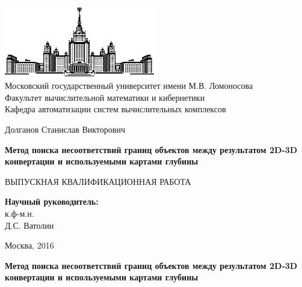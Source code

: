 \documentclass[12pt, a4paper]{article}
\begin{document}
\thispagestyle{empty}

\begin{center}
\ \vspace{-4cm}

\includegraphics[width=0.5\textwidth]{msu}\\
{Московский государственный университет имени М.В. Ломоносова}\\
Факультет вычислительной математики и кибернетики\\
Кафедра автоматизации систем вычислительных комплексов

\vspace{5cm}

{\Large Долганов Станислав Викторович}

\vspace{1cm}

{\Large\bfseries
Метод поиска несоответствий границ объектов между результатом 2D-3D конвертации 
и используемыми картами глубины\\}

\vspace{1cm}

{\large ВЫПУСКНАЯ КВАЛИФИКАЦИОННАЯ  РАБОТА}
\end{center}

\vfill

\begin{flushright}
  \textbf{Научный руководитель:}\\
  к.ф-м.н.\\
  Д.С. Ватолин
\end{flushright}

\vfill

\begin{center}
Москва, 2016
\end{center}

\enlargethispage{4\baselineskip}

\newpage

\textbf{Метод поиска несоответствий границ объектов между результатом 2D-3D конвертации 
и используемыми картами глубины}

\vspace{0.5cm}
\end{document}
